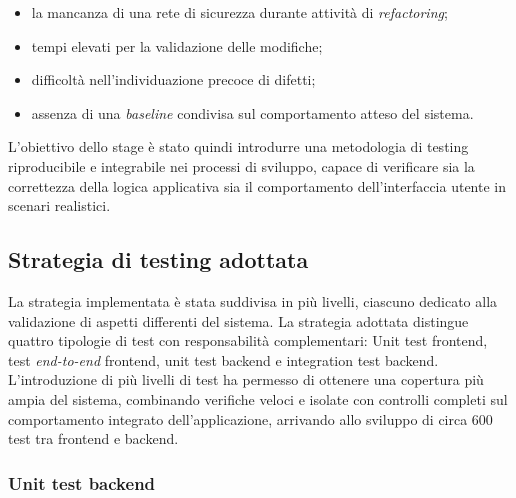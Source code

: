 \begin{itemize}
      \item la mancanza di una rete di sicurezza durante attività di \emph{refactoring};
      \item tempi elevati per la validazione delle modifiche;
      \item difficoltà nell’individuazione precoce di difetti;
      \item assenza di una \emph{baseline} condivisa sul comportamento atteso del sistema.
\end{itemize}
L’obiettivo dello stage è stato quindi introdurre una metodologia di testing
riproducibile e integrabile nei processi di sviluppo, capace di verificare sia
la correttezza della logica applicativa sia il comportamento dell’interfaccia
utente in scenari realistici.

\subsection{Strategia di testing adottata}

La strategia implementata è stata suddivisa in più livelli, ciascuno dedicato
alla validazione di aspetti differenti del sistema.
La strategia adottata distingue quattro tipologie di test con responsabilità
complementari: Unit test frontend, test \emph{end-to-end} frontend, unit test backend
e integration test backend.
L’introduzione di più livelli di test ha permesso di ottenere una copertura più
ampia del sistema, combinando verifiche veloci e isolate con controlli completi
sul comportamento integrato dell’applicazione, arrivando allo sviluppo di circa
600 test tra frontend e backend.

\subsubsection{Unit test backend}

